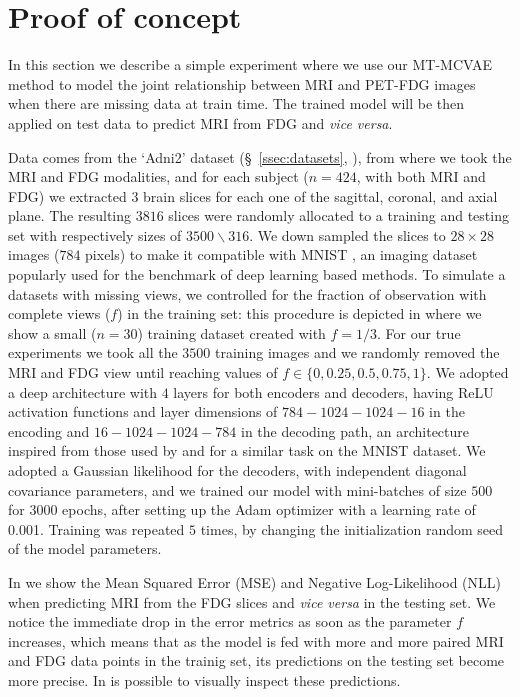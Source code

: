 \section{Proof of concept}
\label{sec:proof_of_concept}

In this section we describe a simple experiment where we use our MT-MCVAE method to model the joint relationship between MRI and PET-FDG images when there are missing data at train time.
The trained model will be then applied on test data to predict MRI from FDG and \textit{vice versa}.

Data comes from the `Adni2' dataset (\S~\ref{ssec:datasets}, ), from where we took the MRI and FDG modalities, and for each subject ($n=424$, with both MRI and FDG) we extracted $3$ brain slices for each one of the sagittal, coronal, and axial plane.
The resulting $3816$ slices were randomly allocated to a training and testing set with respectively sizes of $3500\backslash 316$.
We down sampled the slices to $28 \times 28$ images ($784$ pixels) to make it compatible with MNIST \citep{mnist}, an imaging dataset popularly used for the benchmark of deep learning based methods.
%
To simulate a datasets with missing views, we controlled for the fraction of observation with complete views ($f$) in the training set:
this procedure is depicted in  where we show a small ($n=30$) training dataset created with $f=1/3$.
%
For our true experiments we took all the $3500$ training images and we randomly removed the MRI and FDG view until reaching values of $f \in \{0, 0.25, 0.5, 0.75, 1\}$.
We adopted a deep architecture with $4$ layers for both encoders and decoders, having ReLU activation functions and layer dimensions of $784-1024-1024-16$ in the encoding and $16-1024-1024-784$ in the decoding path,
an architecture inspired from those used by \cite{dcca1} and \cite{dcca2} for a similar task on the MNIST dataset.
We adopted a Gaussian likelihood for the decoders, with independent diagonal covariance parameters, and we trained our model with mini-batches of size $500$ for $3000$ epochs, after setting up the Adam optimizer with a learning rate of 0.001.
Training was repeated $5$ times, by changing the initialization random seed of the model parameters.



In  we show the Mean Squared Error (MSE) and Negative Log-Likelihood (NLL) when predicting MRI from the FDG slices and \textit{vice versa} in the testing set.
We notice the immediate drop in the error metrics as soon as the parameter $f$ increases, which means that as the model is fed with more and more paired MRI and FDG data points in the trainig set, its predictions on the testing set become more precise.
%
In  is possible to visually inspect these predictions.

